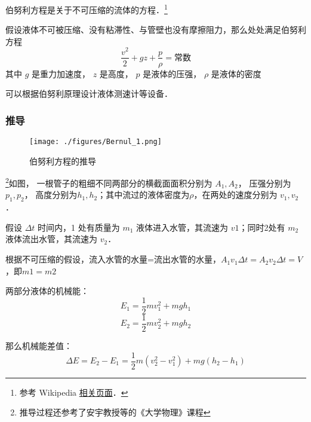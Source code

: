 

伯努利方程是关于不可压缩的流体的方程．\footnote{参考 Wikipedia \href{https://en.wikipedia.org/wiki/Bernoulli-principle}{相关页面}．}

假设液体不可被压缩、没有粘滞性、与管壁也没有摩擦阻力，那么处处满足伯努利方程
\begin{equation}
\frac{v^2}{2} + gz + \frac{p}{\rho} = \text{常数}
\end{equation}
其中 $g$ 是重力加速度， $z$ 是高度， $p$ 是液体的压强， $\rho$ 是液体的密度

可以根据伯努利原理设计液体测速计等设备．

\subsubsection{推导}

\begin{figure}[ht]
\centering
\texttt{[image: ./figures/Bernul\_1.png]}
\caption{伯努利方程的推导}\label{Bernul_fig1}
\end{figure}
\footnote{推导过程还参考了安宇教授等的《大学物理》课程}如图， 一根管子的粗细不同两部分的横截面面积分别为 $A_1, A_2$， 压强分别为 $p_1, p_2$， 高度分别为$h_1, h_2$；其中流过的液体密度为$\rho$，在两处的速度分别为 $v_1, v_2$．

假设 $\Delta t$ 时间内，1 处有质量为 $m_1$ 液体进入水管，其流速为 $v1$；同时2处有 $m_2$ 液体流出水管，其流速为 $v_2$．

根据不可压缩的假设，流入水管的水量=流出水管的水量，$A_1v_1\Delta t=A_2v_2\Delta t=V$，即$m1=m2$

两部分液体的机械能：
\begin{equation}
E_1=\frac{1}{2}mv_1^2+mgh_1
\end{equation}
\begin{equation}
E_2=\frac{1}{2}mv_2^2+mgh_2
\end{equation}

那么机械能差值：
\begin{equation}
\Delta E = E_2 - E_1 = \frac{1}{2}m(v_2^2-v_1^2)+mg(h_2-h_1)
\end{equation}

